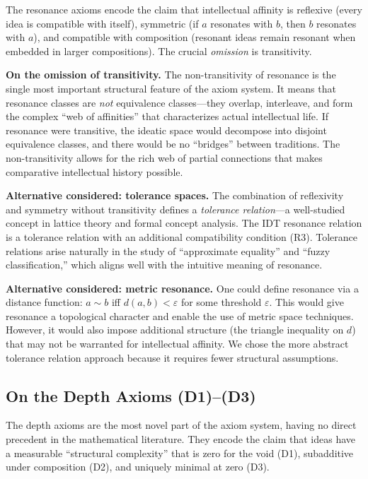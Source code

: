 \documentclass[11pt,openany]{book}
\theoremstyle{definition}
\theoremstyle{plain}
\theoremstyle{remark}
\newcommand{\res}{\sim}                      %
\begin{document}
The resonance axioms encode the claim that intellectual affinity is reflexive (every idea is compatible with itself), symmetric (if $a$ resonates with $b$, then $b$ resonates with $a$), and compatible with composition (resonant ideas remain resonant when embedded in larger compositions). The crucial \emph{omission} is transitivity.

\textbf{On the omission of transitivity.} The non-transitivity of resonance is the single most important structural feature of the axiom system. It means that resonance classes are \emph{not} equivalence classes---they overlap, interleave, and form the complex ``web of affinities'' that characterizes actual intellectual life. If resonance were transitive, the ideatic space would decompose into disjoint equivalence classes, and there would be no ``bridges'' between traditions. The non-transitivity allows for the rich web of partial connections that makes comparative intellectual history possible.

\textbf{Alternative considered: tolerance spaces.} The combination of reflexivity and symmetry without transitivity defines a \emph{tolerance relation}---a well-studied concept in lattice theory and formal concept analysis. The IDT resonance relation is a tolerance relation with an additional compatibility condition (R3). Tolerance relations arise naturally in the study of ``approximate equality'' and ``fuzzy classification,'' which aligns well with the intuitive meaning of resonance.

\textbf{Alternative considered: metric resonance.} One could define resonance via a distance function: $a \res b$ iff $d(a, b) < \varepsilon$ for some threshold $\varepsilon$. This would give resonance a topological character and enable the use of metric space techniques. However, it would also impose additional structure (the triangle inequality on $d$) that may not be warranted for intellectual affinity. We chose the more abstract tolerance relation approach because it requires fewer structural assumptions.

\subsection{On the Depth Axioms (D1)--(D3)}

The depth axioms are the most novel part of the axiom system, having no direct precedent in the mathematical literature. They encode the claim that ideas have a measurable ``structural complexity'' that is zero for the void (D1), subadditive under composition (D2), and uniquely minimal at zero (D3).
\end{document}
